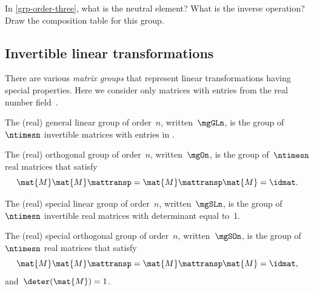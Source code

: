 \begin{gradedexercise}
    \label{ex:GroupWithThreeElements}
    In \cref{grp-order-three}, what is the neutral element?
    What is the inverse operation?
    Draw the composition table for this group.
\end{gradedexercise}




\subsection{Invertible linear transformations}
\label{sec:matrix-grps}


There are various \emph{matrix groups} that represent linear transformations having special properties.
Here we consider only matrices with entries from the real number field~\reals.



\begin{definition}
    \label{def:general-linear-group}
    The (real) general linear group of order~$n$, written~$\mgGLn$, is the group of $\ntimesn$ invertible matrices with entries in \reals.
\end{definition}



\begin{definition}
    \label{def:general-orthogonal-group}
    The (real) orthogonal group of order~$n$, written~$\mgOn$, is the group of~$\ntimesn$ real matrices that satisfy
    \begin{equation}
        \mat{M} \mat{M}\mattransp = \mat{M}\mattransp \mat{M} = \idmat.
    \end{equation}
\end{definition}

\begin{definition}
    \label{def:special-linear-group}
    The (real) special linear group of order~$n$, written~$\mgSLn$, is the group of~$\ntimesn$ invertible real matrices with determinant equal to~1.
\end{definition}
\begin{definition}
    \label{def:special-orthogonal-group}
    The (real) special orthogonal group of order~$n$, written~$\mgSOn$, is the group of~$\ntimesn$ real matrices that satisfy
    \begin{equation}
        \mat{M} \mat{M}\mattransp = \mat{M}\mattransp \mat{M} = \idmat,
    \end{equation}
    and~$\deter(\mat{M}) = 1$.
\end{definition}

